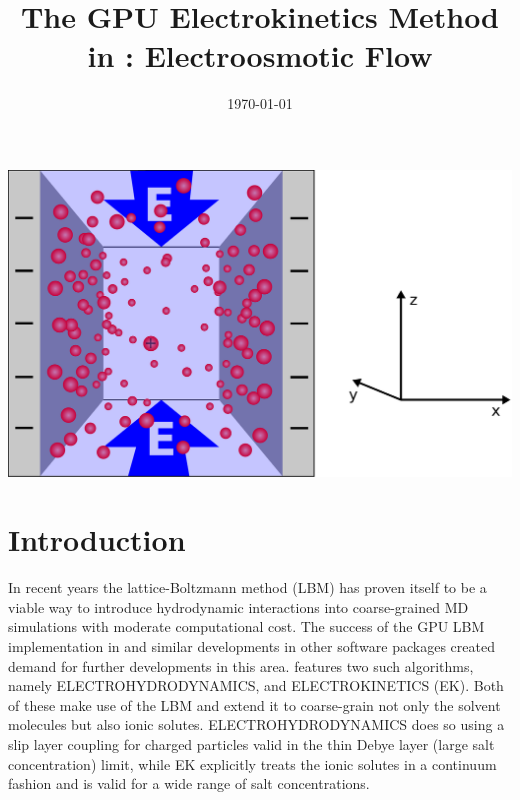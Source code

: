\renewcommand{\d}{\mathrm d}
\subject{ESPResSo Tutorial}
\title{The GPU Electrokinetics Method in \ES{}:
Electroosmotic Flow
} %
\date{\today}
\publishers{Institute for Computational Physics, University of Stuttgart}
\maketitle 
\begin{center}
  \includegraphics[width=0.7\columnwidth]{figures/schlitzpore_3d.pdf}
\end{center}
\pagebreak
{}

 \tableofcontents
 \pagebreak
  
\section{Introduction}


In recent years the lattice-Boltzmann method (LBM) has proven itself to be a viable way to introduce hydrodynamic interactions into coarse-grained MD simulations with moderate computational cost. The success of the GPU LBM implementation in \ES{} and similar developments in other software packages created demand for further developments in this area. \ES{} features two such algorithms, namely ELECTROHYDRODYNAMICS, and ELECTROKINETICS (EK). Both of these make use of the LBM and extend it to coarse-grain not only the solvent molecules but also ionic solutes. ELECTROHYDRODYNAMICS does so using a slip layer coupling for charged particles valid in the thin Debye layer (large salt concentration) limit\cite{hickey10a}, while EK explicitly treats the ionic solutes in a continuum fashion and is valid for a wide range of salt concentrations\cite{capuani04a,rempfer13a,rempfer16a}.

